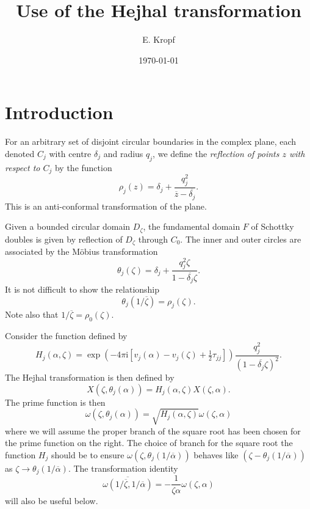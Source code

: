 \documentclass[12pt,fleqn]{article}
\title{Use of the Hejhal transformation}
\author{E. Kropf}
\date{\today}
\renewcommand{\i}{\mathrm{i}}
\newcommand{\conj}[1]{\overline{#1}}
\begin{document}
\maketitle

\section{Introduction}
For an arbitrary set of disjoint circular boundaries in the complex plane, each denoted $C_j$ with centre $\delta_j$ and radius $q_j$, we define the \emph{reflection of points $z$ with respect to $C_j$} by the function
\begin{equation}
  \rho_j(z) = \delta_j + \frac{q_j^2}{\conj{z} - \conj{\delta_j}}.
\end{equation}
This is an anti-conformal transformation of the plane.

Given a bounded circular domain $D_\zeta$, the fundamental domain $F$ of Schottky doubles is given by reflection of $D_\zeta$ through $C_0$. The inner and outer circles are associated by the M\"obius transformation
\begin{equation}
  \theta_j(\zeta) = \delta_j + \frac{q_j^2\zeta}{1 - \conj{\delta_j}\zeta}.
\end{equation}
It is not difficult to show the relationship
\begin{equation}
  \theta_j(1/\conj{\zeta}) = \rho_j(\zeta).
\end{equation}
Note also that $1/\conj{\zeta} = \rho_0(\zeta)$.

Consider the function defined by
\begin{equation}
  H_j(\alpha,\zeta) = \exp\left( -4\pi\i \left[ v_j(\alpha) - v_j(\zeta) + \tfrac{1}{2} \tau_{jj} \right] \right) \frac{q_j^2}{(1 - \conj{\delta_j}\zeta)^2}.
\end{equation}
The Hejhal transformation is then defined by
\begin{equation}
  X(\zeta,\theta_j(\alpha)) = H_j(\alpha,\zeta) X(\zeta,\alpha).
\end{equation}
The prime function is then
\begin{equation}
  \omega(\zeta,\theta_j(\alpha)) = \sqrt{H_j(\alpha,\zeta)} \omega(\zeta,\alpha)
\end{equation}
where we will assume the proper branch of the square root has been chosen for the prime function on the right. The choice of branch for the square root the function $H_j$ should be to ensure $\omega(\zeta,\theta_j(1/\conj{\alpha}))$ behaves like $(\zeta - \theta_j(1/\conj{\alpha}))$ as $\zeta\to\theta_j(1/\conj{\alpha})$. The transformation identity
\begin{equation}
  \conj{\omega(1/\conj{\zeta},1/\conj{\alpha})} = -\frac{1}{\zeta\alpha} \omega(\zeta,\alpha) 
\end{equation}
will also be useful below.
\end{document}
